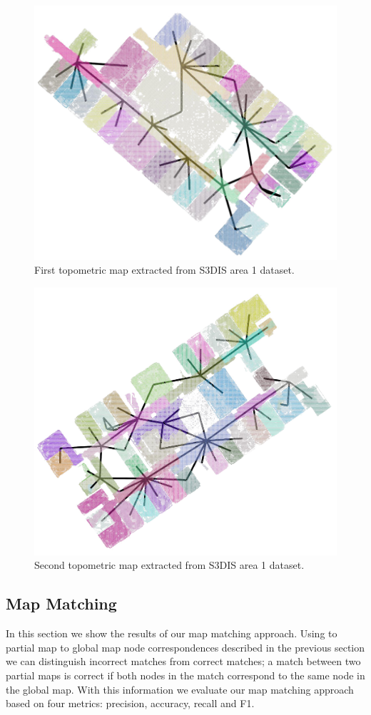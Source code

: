     \begin{figure}[h]
        \centering
        \includegraphics*[width=.6\textwidth]{./fig/area_1_topo_01.png}
        \caption{First topometric map extracted from S3DIS area 1 dataset.}
        \label{fig:area_1_topo_01}
    \end{figure}
    
    \begin{figure}[h]
        \centering
        \includegraphics*[width=.6\textwidth]{./fig/area_1_topo_02.png}
        \caption{Second topometric map extracted from S3DIS area 1 dataset.}
        \label{fig:area_1_topo_02}
    \end{figure}

\pagebreak
\pagebreak

\subsection{Map Matching}
In this section we show the results of our map matching approach. Using to partial map to global map node correspondences described in the previous section we can distinguish incorrect matches from correct matches; a match between two partial maps is correct if both nodes in the match correspond to the same node in the global map. With this information we evaluate our map matching approach based on four metrics: precision, accuracy, recall and F1. 

